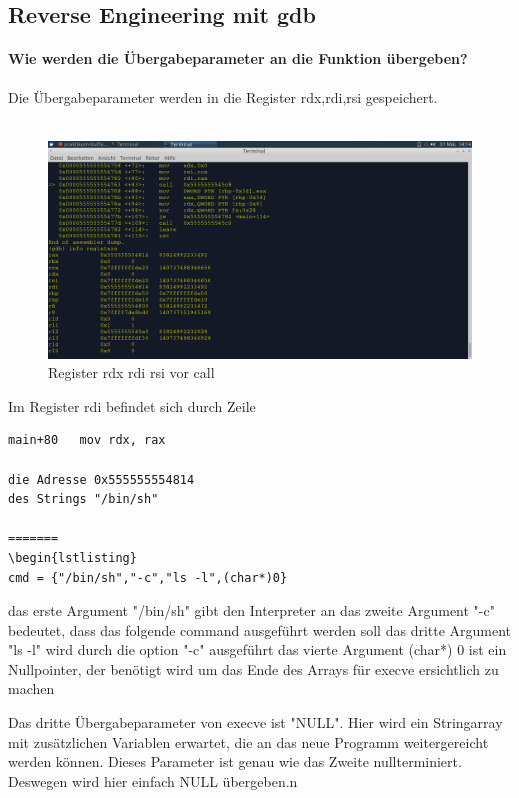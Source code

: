\documentclass[12pt]{article}
\begin{document}
		\subsection{Reverse Engineering mit gdb}

			\paragraph{Wie werden die \"Ubergabeparameter an die Funktion \"ubergeben?}
			Die \"Ubergabeparameter werden in die Register rdx,rdi,rsi gespeichert.
			\\~\\


			\begin{figure}[h!]
				\includegraphics[width = 20cm]{../images/Bufferoverflow_Aufgabe1_Adressen_auf_string_direkt_vor_call.png}
				\caption{Register rdx rdi rsi vor call}
			\end{figure}

			Im Register rdi befindet sich durch Zeile 
			\begin{lstlisting}
main+80   mov rdx, rax

die Adresse 0x555555554814
des Strings "/bin/sh"
 
=======
\begin{lstlisting}
cmd = {"/bin/sh","-c","ls -l",(char*)0}
\end{lstlisting}
das erste Argument "/bin/sh" gibt den Interpreter  an
das zweite Argument "-c" bedeutet, dass das folgende command ausgeführt werden soll
das dritte Argument "ls -l" wird durch die option "-c" ausgeführt
das vierte Argument (char*) 0 ist ein Nullpointer, der benötigt wird
um das Ende des Arrays für execve ersichtlich zu machen

Das dritte Übergabeparameter von execve ist "NULL".
Hier wird ein Stringarray mit zusätzlichen Variablen erwartet, die an
das neue Programm weitergereicht werden können.
Dieses Parameter ist genau wie das Zweite nullterminiert.
Deswegen wird hier einfach NULL übergeben.n
\end{document}
